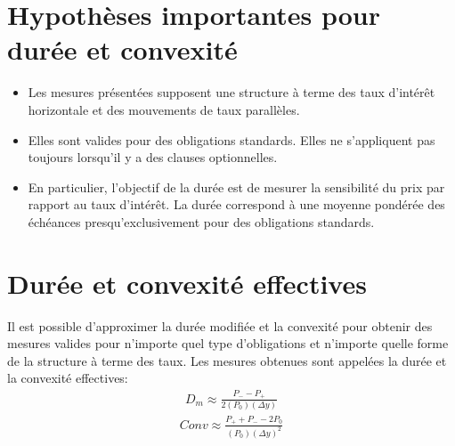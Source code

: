 \documentclass[12pt]{article}
\begin{document}
\section{Hypothèses importantes pour durée et convexité}
\begin{itemize}
\item Les mesures présentées supposent une structure à terme des taux d’intérêt horizontale et des mouvements de taux parallèles.
\item Elles sont valides pour des obligations standards. Elles ne s’appliquent pas toujours lorsqu’il y a des clauses optionnelles.
\item En particulier, l’objectif de la durée est de mesurer la sensibilité du prix par rapport au taux d’intérêt. La durée correspond à une moyenne pondérée des échéances presqu’exclusivement pour des obligations standards.
\end{itemize}
\section{Durée et convexité effectives}
Il est possible d’approximer la durée modifiée et la convexité pour obtenir des mesures valides pour n’importe quel type d’obligations et n’importe quelle forme de la structure à terme des taux. Les mesures obtenues sont appelées la durée et la convexité effectives:
\begin{align*}
D_m \approx \frac{P_{-}-P_{+}}{2(P_0)(\Delta y)}
\end{align*}
\begin{align*}
Conv\approx \frac{P_{+}+P_{-}-2P_0}{(P_0)(\Delta y)^2}
\end{align*}
\end{document}
